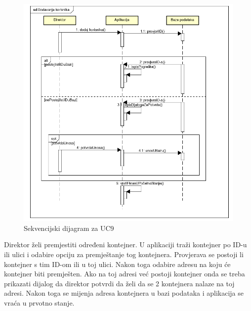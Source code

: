 			\begin{figure}
				\centering
				\includegraphics[width=1.0\linewidth]{"slike/Sekvencijski dijagram za dodavanje korisnika.png"}
				\caption{Sekvencijski dijagram za UC9}
				\label{fig:sekvencijski-dijagram-za-dodavanje-korisnika}
			\end{figure}
			
			\clearpage	 
			
			
			\noindent
			Direktor želi premjestiti određeni kontejner. U aplikaciji traži kontejner po ID-u ili ulici i odabire opciju za premještanje tog kontejnera. Provjerava se postoji li kontejner s tim ID-om ili u toj ulici. Nakon toga odabire adresu na koju će kontejner biti premješten. Ako na toj adresi već postoji kontejner onda se treba prikazati dijalog da direktor potvrdi da želi da se 2 kontejnera nalaze na toj adresi. Nakon toga se mijenja adresa kontejnera u bazi podataka i aplikacija se vraća u prvotno stanje.
			
			\clearpage	 
			
